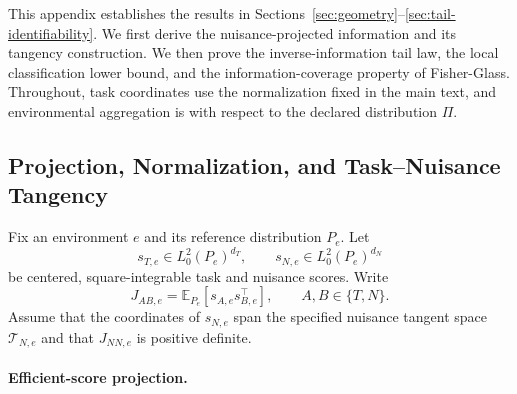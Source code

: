
This appendix establishes the results in Sections~\ref{sec:geometry}--\ref{sec:tail-identifiability}. We first derive the nuisance-projected information and its tangency construction. We then prove the inverse-information tail law, the local classification lower bound, and the information-coverage property of Fisher-Glass. Throughout, task coordinates use the normalization fixed in the main text, and environmental aggregation is with respect to the declared distribution \(\Pi\).

\subsection{Projection, Normalization, and Task--Nuisance Tangency}
\label{app:theory-projection}

Fix an environment \(e\) and its reference distribution \(P_e\). Let
\[
s_{T,e}\in L_0^2(P_e)^{d_T},
\qquad
s_{N,e}\in L_0^2(P_e)^{d_N}
\]
be centered, square-integrable task and nuisance scores. Write
\[
J_{AB,e}
=
\mathbb E_{P_e}\!\left[s_{A,e}s_{B,e}^{\top}\right],
\qquad A,B\in\{T,N\}.
\]
Assume that the coordinates of \(s_{N,e}\) span the specified nuisance tangent space \(\mathcal T_{N,e}\) and that \(J_{NN,e}\) is positive definite.

\paragraph{Efficient-score projection.}

